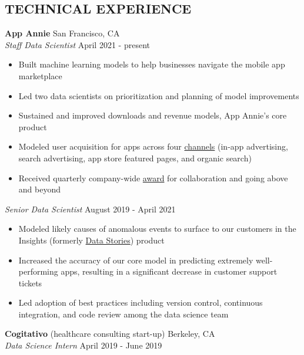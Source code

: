\documentclass[line,margin,10pt]{res}
\begin{document}
\begin{resume}
\section{TECHNICAL EXPERIENCE}
\textbf{App Annie} \hfill San Francisco, CA\\
{\sl Staff  Data Scientist} \hfill April 2021 - present
\begin{itemize} \itemsep -2pt
\item Built machine learning models to help businesses navigate the mobile app marketplace
\item Led two data scientists on prioritization and planning of model improvements
\item Sustained and improved downloads and revenue models, App Annie's core product
\item Modeled user acquisition for apps across four \href{https://www.appannie.com/en/insights/product-announcements/understand-paid-vs-organic-downloads-with-improved-download-channel-report/}{channels} (in-app advertising, search advertising, app store featured pages, and organic search)
\item Received quarterly company-wide \href{https://www.linkedin.com/pulse/meet-abbie-popa-staff-data-scientist-from-our-amer-region-thomas/?trackingId=BPJh%2B6dFR%2Baz%2BUpkpGznRA%3D%3D}{award} for collaboration and going above and beyond
\end{itemize}
{\vspace{-0.25cm}}
{\sl Senior Data Scientist} \hfill August 2019 - April 2021
\begin{itemize} \itemsep -2pt
\item Modeled likely causes of anomalous events to surface to our customers in the Insights (formerly \href{https://www.appannie.com/en/insights/product-announcements/data-stories-labs/}{Data Stories}) product
\item Increased the accuracy of our core model in predicting extremely well-performing apps, resulting in a significant decrease in customer support tickets
\item Led adoption of best practices including version control, continuous integration, and code review among the data science team
\end{itemize}
{\vspace{-0.25cm}}
\textbf{Cogitativo} (healthcare consulting start-up) \hfill Berkeley, CA\\
{\sl Data Science Intern} \hfill April 2019 - June 2019
\begin{itemize} \itemsep -2pt

\end{itemize}
\end{resume}
\end{document}
